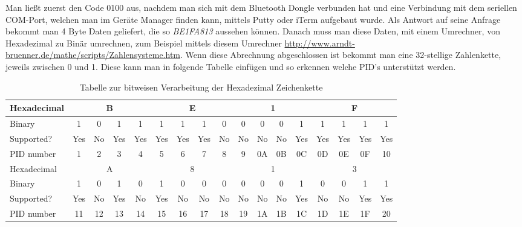 Man ließt zuerst den Code 0100 aus, nachdem man sich mit dem Bluetooth Dongle verbunden hat und eine Verbindung mit dem seriellen COM-Port, welchen man im Geräte Manager finden kann, mittels Putty oder iTerm aufgebaut wurde.
Als Antwort auf seine Anfrage bekommt man 4 Byte Daten geliefert, die so \textit{BE1FA813} aussehen können. Danach muss man diese Daten, mit einem Umrechner, von Hexadezimal zu Binär umrechnen, zum Beispiel mittels diesem Umrechner \url{http://www.arndt-bruenner.de/mathe/scripts/Zahlensysteme.htm}. Wenn diese Abrechnung abgeschlossen ist bekommt man eine 32-stellige Zahlenkette, jeweils zwischen 0 und 1. 
Diese kann man in folgende Tabelle einfügen und so erkennen welche PID's unterstützt werden.

\begin{table}[!htb]
\centering
\begin{tabular}{|l|c|c|c|c|c|c|c|c|c|c|c|c|c|c|c|c|}
\hline
Hexadecimal & \multicolumn{4}{c|}{B} & \multicolumn{4}{c|}{E} & \multicolumn{4}{c|}{1} & \multicolumn{4}{c|}{F} \\ \hline
Binary & 1 & 0 & 1 & 1 & 1 & 1 & 1 & 0 & 0 & 0 & 0 & 1 & 1 & 1 & 1 & 1 \\ \hline
Supported? & \cellcolor[HTML]{9AFF99}Yes & \cellcolor[HTML]{FD6864}No & \cellcolor[HTML]{9AFF99}Yes & \cellcolor[HTML]{9AFF99}Yes & \cellcolor[HTML]{9AFF99}Yes & \cellcolor[HTML]{9AFF99}Yes & \cellcolor[HTML]{9AFF99}Yes & \cellcolor[HTML]{FD6864}No & \cellcolor[HTML]{FD6864}No & \cellcolor[HTML]{FD6864}No & \cellcolor[HTML]{FD6864}No & \cellcolor[HTML]{9AFF99}Yes & \cellcolor[HTML]{9AFF99}Yes & \cellcolor[HTML]{9AFF99}Yes & \cellcolor[HTML]{9AFF99}Yes & \cellcolor[HTML]{9AFF99}Yes \\ \hline
PID number & 1 & 2 & 3 & 4 & 5 & 6 & 7 & 8 & 9 & 0A & 0B & 0C & 0D & 0E & 0F & 10 \\ \hline
Hexadecimal & \multicolumn{4}{c|}{A} & \multicolumn{4}{c|}{8} & \multicolumn{4}{c|}{1} & \multicolumn{4}{c|}{3} \\ \hline
Binary & 1 & 0 & 1 & 0 & 1 & 0 & 0 & 0 & 0 & 0 & 0 & 1 & 0 & 0 & 1 & 1 \\ \hline
Supported? & \cellcolor[HTML]{9AFF99}Yes & \cellcolor[HTML]{FD6864}No & \cellcolor[HTML]{9AFF99}Yes & \cellcolor[HTML]{FD6864}No & \cellcolor[HTML]{9AFF99}Yes & \cellcolor[HTML]{FD6864}No & \cellcolor[HTML]{FD6864}No & \cellcolor[HTML]{FD6864}No & \cellcolor[HTML]{FD6864}No & \cellcolor[HTML]{FD6864}No & \cellcolor[HTML]{FD6864}No & \cellcolor[HTML]{9AFF99}Yes & \cellcolor[HTML]{FD6864}No & \cellcolor[HTML]{FD6864}No & \cellcolor[HTML]{9AFF99}Yes & \cellcolor[HTML]{9AFF99}Yes \\ \hline
PID number & 11 & 12 & 13 & 14 & 15 & 16 & 17 & 18 & 19 & 1A & 1B & 1C & 1D & 1E & 1F & 20 \\ \hline
\end{tabular}
\caption{Tabelle zur bitweisen Verarbeitung der Hexadezimal Zeichenkette \cite{SIMR.CH2-obd2.HextoBinary}}
\label{tableHextoPID}
\end{table}

\clearpage %